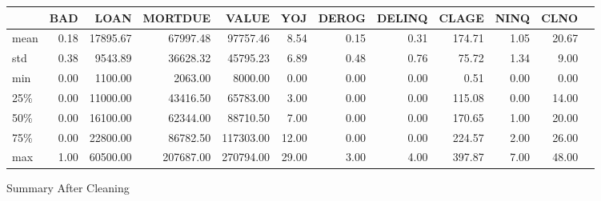 \begin{appendices}
\begin{landscape}
\begin{figure}[ht]
	\centering
	\renewcommand{\arraystretch}{2}
	\begin{tabular}{lrrrrrrrrrrr}
	\toprule
	{} &      BAD &      LOAN &    MORTDUE &      VALUE &      YOJ &    DEROG &   DELINQ &    CLAGE &     NINQ &     CLNO \\
	\midrule
	mean  &     0.18 &  17895.67 &   67997.48 &   97757.46 &     8.54 &     0.15 &     0.31 &   174.71 &     1.05 &    20.67 \\
	std   &     0.38 &   9543.89 &   36628.32 &   45795.23 &     6.89 &     0.48 &     0.76 &    75.72 &     1.34 &     9.00 \\
	min   &     0.00 &   1100.00 &    2063.00 &    8000.00 &     0.00 &     0.00 &     0.00 &     0.51 &     0.00 &     0.00 \\
	25\%   &     0.00 &  11000.00 &   43416.50 &   65783.00 &     3.00 &     0.00 &     0.00 &   115.08 &     0.00 &    14.00 \\
	50\%   &     0.00 &  16100.00 &   62344.00 &   88710.50 &     7.00 &     0.00 &     0.00 &   170.65 &     1.00 &    20.00 \\
	75\%   &     0.00 &  22800.00 &   86782.50 &  117303.00 &    12.00 &     0.00 &     0.00 &   224.57 &     2.00 &    26.00 \\
	max   &     1.00 &  60500.00 &  207687.00 &  270794.00 &    29.00 &     3.00 &     4.00 &   397.87 &     7.00 &    48.00 \\
	\bottomrule
	\end{tabular}
	\caption{Summary After Cleaning \label{SUM_AFT_TBL}}
\end{figure}
\end{landscape}


\end{appendices}
